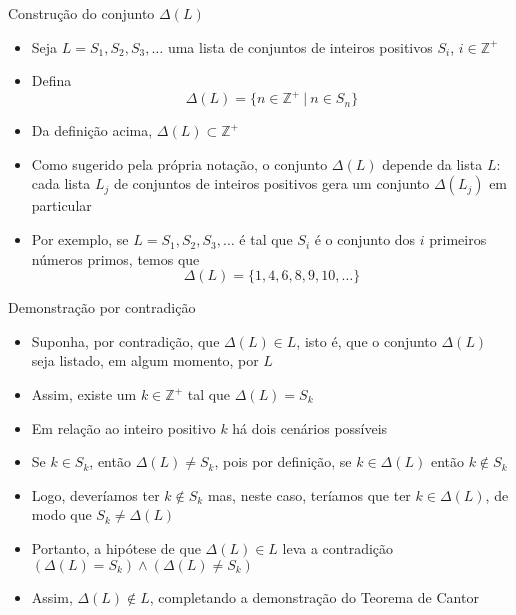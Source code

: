 \begin{frame}[fragile]{Construção do conjunto $\Delta(L)$}

    \begin{itemize}
        \item Seja $L = S_1, S_2, S_3, \ldots$ uma lista de conjuntos de inteiros positivos $S_i$,
            $i\in \mathbb{Z}^+$

        \item Defina
        \[
            \Delta(L) = \lbrace n\in\mathbb{Z}^+\ |\ n \in S_n\rbrace
        \]

        \item Da definição acima, $\Delta(L)\subset \mathbb{Z}^+$

        \item Como sugerido pela própria notação, o conjunto $\Delta(L)$ depende da lista $L$:
            cada lista $L_j$ de conjuntos de inteiros positivos gera um conjunto $\Delta(L_j)$
            em particular

        \item Por exemplo, se $L = S_1, S_2, S_3, \ldots$ é tal que $S_i$ é o conjunto dos
            $i$ primeiros números primos, temos que
        \[
            \Delta(L) = \lbrace 1, 4, 6, 8, 9, 10, \ldots \rbrace
        \]
    \end{itemize}

\end{frame}

\begin{frame}[fragile]{Demonstração por contradição}

    \begin{itemize}
        \item Suponha, por contradição, que $\Delta(L)\in L$, isto é, que o conjunto $\Delta(L)$
            seja listado, em algum momento, por $L$

        \item Assim, existe um $k\in\mathbb{Z}^+$ tal que $\Delta(L) = S_k$

        \item Em relação ao inteiro positivo $k$ há dois cenários possíveis

        \item Se $k\in S_k$, então $\Delta(L)\neq S_k$, pois por definição, se $k\in\Delta(L)$ então
            $k\not\in S_k$

        \item Logo, deveríamos ter $k\not\in S_k$ mas, neste caso, teríamos que ter $k\in\Delta(L)$,
            de modo que $S_k\neq \Delta(L)$

        \item Portanto, a hipótese de que $\Delta(L)\in L$ leva a contradição
            $(\Delta(L)=S_k) \land (\Delta(L)\neq S_k)$

        \item Assim, $\Delta(L)\not\in L$, completando a demonstração do Teorema de Cantor
    \end{itemize}

\end{frame}


